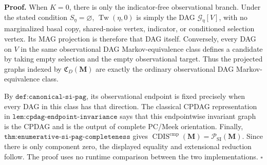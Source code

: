 \textbf{Proof.}
When \(K=0\), there is only the indicator-free observational branch.  Under the stated condition \(S_\eta=\varnothing\), \(\operatorname{Tw}(\eta,0)\) is simply the DAG \(\mathcal G_\eta[V]\), with no marginalized basal copy, shared-noise vertex, indicator, or conditioned selection vertex.  Its MAG projection is therefore that DAG itself.  Conversely, every DAG on \(V\) in the same observational DAG Markov-equivalence class defines a candidate by taking empty selection and the empty observational target.  Thus the projected graphs indexed by \(\mathfrak C_D(\mathbf M)\) are exactly the ordinary observational DAG Markov-equivalence class.

By \(\texttt{def:canonical-si-pag}\), its observational endpoint is fixed precisely when every DAG in this class has that direction.  The classical CPDAG representation in \(\texttt{lem:cpdag-endpoint-invariance}\) says that this endpointwise invariant graph is the CPDAG and is the output of complete PC/Meek orientation.  Finally, \(\texttt{thm:enumerative-si-pag-completeness}\) gives \(\operatorname{CDIS}^{\mathrm{cmp}}(\mathbf M)=\mathcal P_{\mathrm{SI}}(\mathbf M)\).  Since there is only component zero, the displayed equality and extensional reduction follow.  The proof uses no runtime comparison between the two implementations. \(\square\)